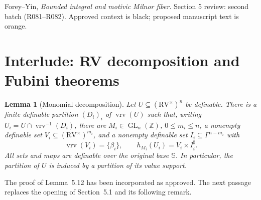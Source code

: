 \documentclass[12pt]{amsart}
\newtheorem{lem}{Lemma}[section]
\theoremstyle{remark}
\newcommand{\RV}{\mathrm{RV}}
\newcommand{\Z}{\mathds{Z}}
\newcommand{\vrv}{\operatorname{vrv}}
\newcommand{\GL}{\operatorname{GL}}
\newcommand{\Sbase}{\mathbb S}
\numberwithin{equation}{section}
\begin{document}
\setcounter{section}{4}
{\small\noindent Forey--Yin, \emph{Bounded integral and motivic Milnor fiber}.
Section 5 review: second batch (R081--R082).
Approved context is black; proposed manuscript text is orange.}
\medskip
\section{Interlude: RV decomposition and Fubini theorems}\label{csndag}
\setcounter{lem}{11}
\begin{lem}[Monomial decomposition]\label{coh:decom}
Let $U\subseteq(\RV^\times)^n$ be definable. There is a finite definable
partition $(D_i)_i$ of $\vrv(U)$ such that, writing
$U_i=U\cap\vrv^{-1}(D_i)$, there are $M_i\in\GL_n(\Z)$,
$0\leq m_i\leq n$, a nonempty definable set
$V_i\subseteq(\RV^\times)^{m_i}$, and a nonempty definable set
$I_i\subseteq\Gamma^{n-m_i}$ with
\[
 \vrv(V_i)=\{\beta_i\},\qquad
 h_{M_i}(U_i)=V_i\times I_i^\sharp .
\]
All sets and maps are definable over the original base $\Sbase$.
In particular, the partition of $U$ is induced by a partition of
its value support.
\end{lem}
{\normalfont\small\color{ResolutionGreen}
\noindent The proof of Lemma~5.12 has been incorporated as approved.
The next passage replaces the opening of Section~5.1 and its following remark.\par}
\medskip
\end{document}
